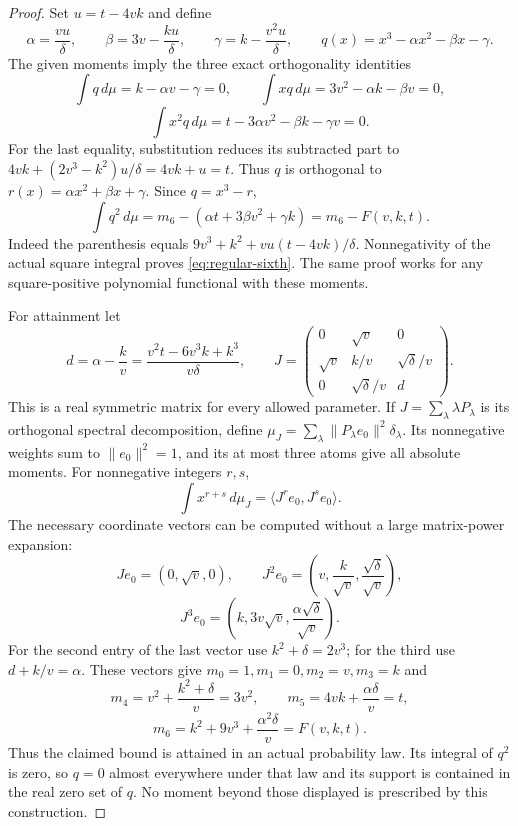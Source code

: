 \documentclass[11pt]{article}
\begin{document}
\begin{proof}
Set $u=t-4vk$ and define
\[
 \alpha=\frac{vu}{\delta},\qquad
 \beta=3v-\frac{ku}{\delta},\qquad
 \gamma=k-\frac{v^2u}{\delta},\qquad
 q(x)=x^3-\alpha x^2-\beta x-\gamma.
\]
The given moments imply the three exact orthogonality identities
\[
 \int q\,d\mu=k-\alpha v-\gamma=0,
 \qquad \int xq\,d\mu=3v^2-\alpha k-\beta v=0,
\]
\[
 \int x^2q\,d\mu=t-3\alpha v^2-\beta k-\gamma v=0.
\]
For the last equality, substitution reduces its subtracted part to
$4vk+(2v^3-k^2)u/\delta=4vk+u=t$. Thus $q$ is orthogonal to
$r(x)=\alpha x^2+\beta x+\gamma$. Since $q=x^3-r$,
\[
 \int q^2\,d\mu=m_6-(\alpha t+3\beta v^2+\gamma k)
 =m_6-F(v,k,t).
\]
Indeed the parenthesis equals
$9v^3+k^2+vu(t-4vk)/\delta$. Nonnegativity of the actual square
integral proves \eqref{eq:regular-sixth}. The same proof works for
any square-positive polynomial functional with these moments.

For attainment let
\[
 d=\alpha-\frac{k}{v}
   =\frac{v^2t-6v^3k+k^3}{v\delta},\qquad
 J=\begin{pmatrix}
 0&\sqrt v&0\\
 \sqrt v&k/v&\sqrt\delta/v\\
 0&\sqrt\delta/v&d
 \end{pmatrix}.
\]
This is a real symmetric matrix for every allowed parameter. If
$J=\sum_\lambda\lambda P_\lambda$ is its orthogonal spectral
decomposition, define
$\mu_J=\sum_\lambda\|P_\lambda e_0\|^2\delta_\lambda$.
Its nonnegative weights sum to $\|e_0\|^2=1$, and its at most
three atoms give all absolute moments. For nonnegative integers
$r,s$,
\[
 \int x^{r+s}\,d\mu_J
 =\langle J^re_0,J^se_0\rangle.
\]
The necessary coordinate vectors can be computed without a large
matrix-power expansion:
\[
 Je_0=(0,\sqrt v,0),\qquad
 J^2e_0=\left(v,\frac{k}{\sqrt v},\frac{\sqrt\delta}{\sqrt v}\right),
\]
\[
 J^3e_0=\left(k,3v\sqrt v,
                    \frac{\alpha\sqrt\delta}{\sqrt v}\right).
\]
For the second entry of the last vector use
$k^2+\delta=2v^3$; for the third use $d+k/v=\alpha$.
These vectors give $m_0=1,m_1=0,m_2=v,m_3=k$ and
\[
 m_4=v^2+\frac{k^2+\delta}{v}=3v^2,\qquad
 m_5=4vk+\frac{\alpha\delta}{v}=t,
\]
\[
 m_6=k^2+9v^3+\frac{\alpha^2\delta}{v}=F(v,k,t).
\]
Thus the claimed bound is attained in an actual probability law.
Its integral of $q^2$ is zero, so $q=0$ almost everywhere under
that law and its support is contained in the real zero set of $q$.
No moment beyond those displayed is prescribed by this construction.
\end{proof}
\end{document}
